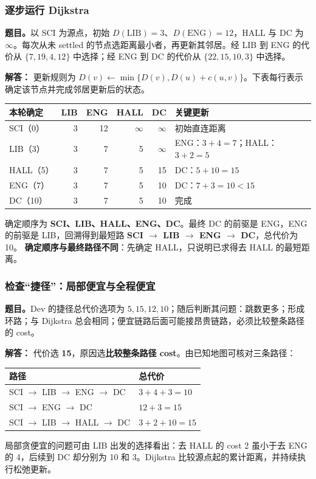 \documentclass[11pt,a4paper,fontset=fandol]{ctexart}
\renewcommand{\exercisequestion}[2]{%
  \Needspace{5\baselineskip}%
  \subsubsection{#2}\label{exercise:#1}%
}
\renewenvironment{checkedsolution}
  {\par\nopagebreak[4]\textbf{解答：}\ignorespaces}
  {\par}
\begin{document}
\exercisequestion{SC2008-HW03-Q05}{逐步运行 Dijkstra}
\textbf{题目。}以 SCI 为源点，初始 $D(\mathrm{LIB})=3$、$D(\mathrm{ENG})=12$，HALL 与 DC 为 $\infty$。每次从未 settled 的节点选距离最小者，再更新其邻居。经 LIB 到 ENG 的代价从 $\{7,19,4,12\}$ 中选择；经 ENG 到 DC 的代价从 $\{22,15,10,3\}$ 中选择。
\begin{checkedsolution}
更新规则为 $D(v)\leftarrow\min\{D(v),D(u)+c(u,v)\}$。下表每行表示确定该节点并完成邻居更新后的状态。
\begin{center}
\small
\begin{tabular}{@{}lrrrrl@{}}
\toprule
本轮确定 & LIB & ENG & HALL & DC & 关键更新 \\
\midrule
SCI（0） & 3 & 12 & $\infty$ & $\infty$ & 初始直连距离 \\
LIB（3） & 3 & 7 & 5 & $\infty$ & ENG：$3+4=7$；HALL：$3+2=5$ \\
HALL（5） & 3 & 7 & 5 & 15 & DC：$5+10=15$ \\
ENG（7） & 3 & 7 & 5 & 10 & DC：$7+3=10<15$ \\
DC（10） & 3 & 7 & 5 & 10 & 完成 \\
\bottomrule
\end{tabular}
\end{center}
确定顺序为 \textbf{SCI、LIB、HALL、ENG、DC}。最终 DC 的前驱是 ENG，ENG 的前驱是 LIB，回溯得到最短路 \textbf{SCI $\to$ LIB $\to$ ENG $\to$ DC}，总代价为 10。
\textbf{确定顺序与最终路径不同}：先确定 HALL，只说明已求得去 HALL 的最短距离。
\end{checkedsolution}

\exercisequestion{SC2008-HW03-Q06}{检查“捷径”：局部便宜与全程便宜}
\textbf{题目。}Dev 的捷径总代价选项为 $5,15,12,10$；随后判断其问题：跳数更多；形成环路；与 Dijkstra 总会相同；便宜链路后面可能接昂贵链路，必须比较整条路径的 cost。
\begin{checkedsolution}
代价选 \textbf{15}，原因选\textbf{比较整条路径 cost}。由已知地图可核对三条路径：
\begin{center}
\small
\begin{tabular}{@{}ll@{}}
\toprule
路径 & 总代价 \\
\midrule
SCI $\to$ LIB $\to$ ENG $\to$ DC & $3+4+3=10$ \\
SCI $\to$ ENG $\to$ DC & $12+3=15$ \\
SCI $\to$ LIB $\to$ HALL $\to$ DC & $3+2+10=15$ \\
\bottomrule
\end{tabular}
\end{center}
局部贪便宜的问题可由 LIB 出发的选择看出：去 HALL 的 cost 2 虽小于去 ENG 的 4，后续到 DC 却分别为 10 和 3。Dijkstra 比较源点起的累计距离，并持续执行松弛更新。
\end{checkedsolution}
\end{document}
